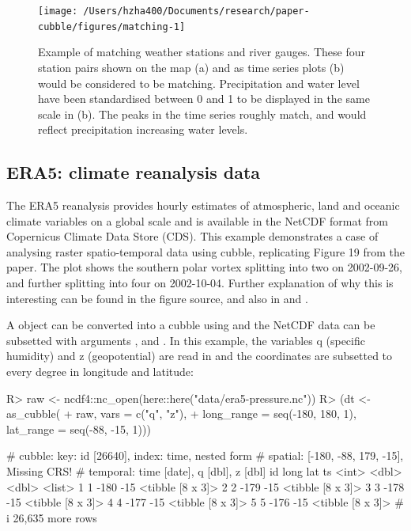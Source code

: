 \documentclass[
  shortnames]{jss}
\begin{document}
\begin{CodeChunk}
\begin{figure}

{\centering \texttt{[image: /Users/hzha400/Documents/research/paper-cubble/figures/matching-1]} 

}

\caption[Example of matching weather stations and river gauges]{Example of matching weather stations and river gauges. These four station pairs shown on the map (a) and as time series plots (b) would be considered to be matching. Precipitation and water level have been standardised between 0 and 1 to be displayed in the same scale in (b). The peaks in the time series roughly match, and would reflect precipitation increasing water levels.}\label{fig:matching}
\end{figure}
\end{CodeChunk}

\hypertarget{era5-climate-reanalysis-data}{%
\subsection{ERA5: climate reanalysis data}\label{era5-climate-reanalysis-data}}

The ERA5 reanalysis \citep{hersbach2020era5} provides hourly estimates of atmospheric, land and oceanic climate variables on a global scale and is available in the NetCDF format from Copernicus Climate Data Store (CDS). This example demonstrates a case of analysing raster spatio-temporal data using cubble, replicating Figure 19 from the \citet{hersbach2020era5} paper. The plot shows the southern polar vortex splitting into two on 2002-09-26, and further splitting into four on 2002-10-04. Further explanation of why this is interesting can be found in the figure source, and also in \citet{simmons2020global} and \citet{simmons2005ecmwf}.

A  object \citep{ncdf4} can be converted into a cubble using  and the NetCDF data can be subsetted with arguments ,  and . In this example, the variables q (specific humidity) and z (geopotential) are read in and the coordinates are subsetted to every degree in longitude and latitude:

\begin{CodeChunk}
\begin{CodeInput}
R> raw <- ncdf4::nc_open(here::here("data/era5-pressure.nc"))
R> (dt <- as_cubble(
+   raw, vars = c("q", "z"),
+   long_range = seq(-180, 180, 1), lat_range = seq(-88, -15, 1)))
\end{CodeInput}
\begin{CodeOutput}
# cubble:   key: id [26640], index: time, nested form
# spatial:  [-180, -88, 179, -15], Missing CRS!
# temporal: time [date], q [dbl], z [dbl]
     id  long   lat ts              
  <int> <dbl> <dbl> <list>          
1     1  -180   -15 <tibble [8 x 3]>
2     2  -179   -15 <tibble [8 x 3]>
3     3  -178   -15 <tibble [8 x 3]>
4     4  -177   -15 <tibble [8 x 3]>
5     5  -176   -15 <tibble [8 x 3]>
# i 26,635 more rows
\end{CodeOutput}
\end{CodeChunk}
\end{document}
